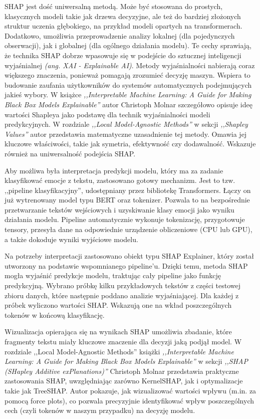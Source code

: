 \documentclass[wmii, inf, mgr]{uwmthesis}
\begin{document}
SHAP jest dość uniwersalną metodą. Może być stosowana do prostych, klasycznych modeli takie jak drzewa decyzyjne, ale też do bardziej złożonych struktur uczenia głębokiego, na przykład modeli opartych na transformerach. Dodatkowo, umożliwia przeprowadzenie analizy lokalnej (dla pojedynczych obserwacji), jak i globalnej (dla ogólnego działania modelu). Te cechy sprawiają, że technika SHAP dobrze wpasowuje się w podejście do sztucznej inteligencji wyjaśnialnej \textit{(ang. XAI - Explainable AI)}. Metody wyjaśnialności nabierają coraz większego znaczenia, ponieważ pomagają zrozumieć decyzję maszyn. Wspiera to budowanie zaufania użytkowników do systemów automatycznych podejmujących jakieś wybory. W książce \textit{,,Interpretable Machine Learning: A Guide for Making Black Box Models Explainable''} \cite{SHAP} autor Christoph Molnar szczegółowo opisuje ideę wartości Shapleya jako podstawę dla technik wyjaśnialności modeli predykcyjnych. W rozdziale \textit{,,Local Model-Agnostic Methods''} w sekcji \textit{,,Shapley Values''} autor przedstawia matematyczne uzasadnienie tej metody. Omawia jej kluczowe właściwości, takie jak symetria, efektywność czy dodawalność. Wskazuje również na uniwersalność podejścia SHAP.

Aby możliwa była interpretacja predykcji modelu, który ma za zadanie klasyfikować emocje z tekstu, zastosowano gotowy mechanizm. Jest to tzw. ,,pipeline klasyfikacyjny'', udostępniany przez bibliotekę Transformers. Łączy on już wytrenowany model typu BERT oraz tokenizer. Pozwala to na bezpośrednie przetwarzanie tekstów wejściowych i uzyskiwanie klasy emocji jako wyniku działania modelu. Pipeline automatycznie wykonuje tokenizację, przygotowuje tensory, przesyła dane na odpowiednie urządzenie obliczeniowe (CPU lub GPU), a także dokoduje wyniki wyjściowe modelu.

Na potrzeby interpretacji zastosowano obiekt typu SHAP Explainer, który został utworzony na podstawie wspomnianego pipeline’u. Dzięki temu, metoda SHAP mogła wyjaśnić predykcje modelu, traktując cały pipeline jako funkcję predykcyjną. Wybrano próbkę kilku przykładowych tekstów z części testowej zbioru danych, które następnie poddano analizie wyjaśniającej. Dla każdej z próbek wyliczono wartości SHAP. Wskazują one na wkład poszczególnych tokenów w końcową klasyfikację. 
 
Wizualizacja opierająca się na wynikach SHAP umożliwia zbadanie, które fragmenty tekstu miały kluczowe znaczenie dla decyzji jaką podjął model. W rozdziale ,,Local Model-Agnostic Methods'' książki \textit{,,Interpretable Machine Learning: A Guide for Making Black Box Models Explainable''} \cite{SHAP} w sekcji \textit{,,SHAP (SHapley Additive exPlanations)''} Christoph Molnar przedstawia praktyczne zastosowania SHAP, uwzględniając zarówno KernelSHAP, jak i optymalizacje takie jak TreeSHAP. Autor pokazuje, jak wizualizować wartości wpływu (m.in. za pomocą force plots), co pozwala precyzyjnie identyfikować wpływ poszczególnych cech (czyli tokenów w naszym przypadku) na decyzję modelu.
\end{document}

